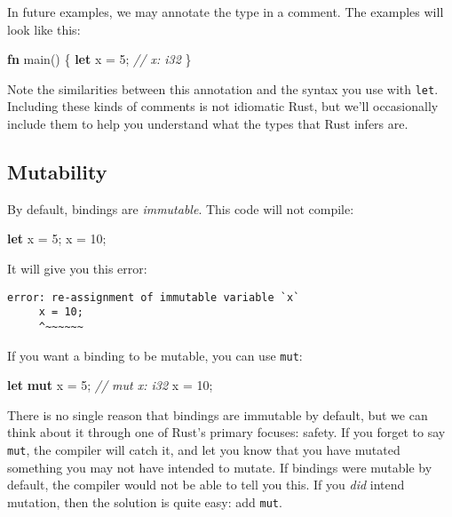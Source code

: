 \documentclass[a4paper,]{book}
\newenvironment{Shaded}{\begin{snugshade}}{\end{snugshade}}
\newcommand{\KeywordTok}[1]{\textcolor[rgb]{0.13,0.29,0.53}{\textbf{{#1}}}}
\newcommand{\DecValTok}[1]{\textcolor[rgb]{0.00,0.00,0.81}{{#1}}}
\newcommand{\CommentTok}[1]{\textcolor[rgb]{0.56,0.35,0.01}{\textit{{#1}}}}
\newcommand{\NormalTok}[1]{{#1}}
\begin{document}
In future examples, we may annotate the type in a comment. The examples
will look like this:

\begin{Shaded}
\begin{Highlighting}[]
\KeywordTok{fn} \NormalTok{main() \{}
    \KeywordTok{let} \NormalTok{x = }\DecValTok{5}\NormalTok{; }\CommentTok{// x: i32}
\NormalTok{\}}
\end{Highlighting}
\end{Shaded}

Note the similarities between this annotation and the syntax you use
with \texttt{let}. Including these kinds of comments is not idiomatic
Rust, but we'll occasionally include them to help you understand what
the types that Rust infers are.

\subsection{Mutability}\label{mutability}

By default, bindings are \emph{immutable}. This code will not compile:

\begin{Shaded}
\begin{Highlighting}[]
\KeywordTok{let} \NormalTok{x = }\DecValTok{5}\NormalTok{;}
\NormalTok{x = }\DecValTok{10}\NormalTok{;}
\end{Highlighting}
\end{Shaded}

It will give you this error:

\begin{verbatim}
error: re-assignment of immutable variable `x`
     x = 10;
     ^~~~~~~
\end{verbatim}

If you want a binding to be mutable, you can use \texttt{mut}:

\begin{Shaded}
\begin{Highlighting}[]
\KeywordTok{let} \KeywordTok{mut} \NormalTok{x = }\DecValTok{5}\NormalTok{; }\CommentTok{// mut x: i32}
\NormalTok{x = }\DecValTok{10}\NormalTok{;}
\end{Highlighting}
\end{Shaded}

There is no single reason that bindings are immutable by default, but we
can think about it through one of Rust's primary focuses: safety. If you
forget to say \texttt{mut}, the compiler will catch it, and let you know
that you have mutated something you may not have intended to mutate. If
bindings were mutable by default, the compiler would not be able to tell
you this. If you \emph{did} intend mutation, then the solution is quite
easy: add \texttt{mut}.
\end{document}
